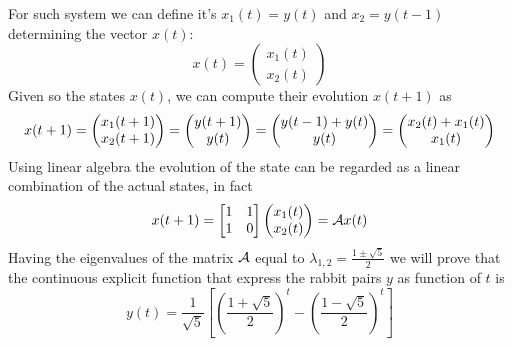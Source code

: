 	For such system we can define it's  $x_1(t) = y(t)$ and $x_2 = y(t-1)$ determining the vector $x(t)$:
	\begin{equation}
		x(t) = \begin{pmatrix}
			x_1(t) \\ x_2(t)
		\end{pmatrix}
	\end{equation}
	Given so the states $x(t)$, we can compute their evolution $x(t+1)$ as
	\[ x(t+1) = \begin{pmatrix} x_1(t+1) \\ x_2(t+1) \end{pmatrix} = \begin{pmatrix} y(t+1) \\ y(t) \end{pmatrix} = \begin{pmatrix} y(t-1) + y(t) \\ y(t) \end{pmatrix} = \begin{pmatrix} x_2(t) + x_1(t) \\ x_1(t) \end{pmatrix}\]
	Using linear algebra the evolution of the state can be regarded as a linear combination of the actual states, in fact
	\begin{equation}
		x(t+1) = \begin{bmatrix} 1 & 1 \\ 1 & 0 \end{bmatrix} \begin{pmatrix} x_1(t) \\ x_2(t) \end{pmatrix} = \mathcal{A} x(t)
	\end{equation}
	Having the eigenvalues of the matrix $\mathcal{A}$ equal to $\lambda_{1,2} = \frac{1 \pm \sqrt 5}{2}$ we will prove that the continuous explicit function that express the rabbit pairs $y$ as function of $t$ is
	\[ y(t) = \frac1{\sqrt{5}} \left[ \left(\frac{1 + \sqrt 5}{2}\right)^t - \left(\frac{1 - \sqrt 5}{2}\right)^t \right] \]
	
